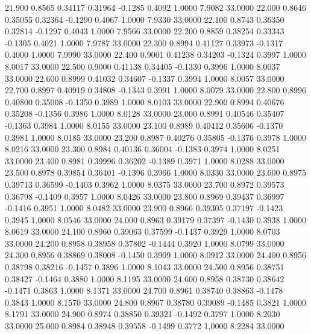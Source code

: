   21.900   0.8565   0.34117   0.31964  -0.1285   0.4092   1.0000   7.9082  33.0000
  22.000   0.8646   0.35055   0.32364  -0.1290   0.4067   1.0000   7.9330  33.0000
  22.100   0.8743   0.36350   0.32814  -0.1297   0.4043   1.0000   7.9566  33.0000
  22.200   0.8859   0.38254   0.33343  -0.1305   0.4021   1.0000   7.9787  33.0000
  22.300   0.8994   0.41127   0.33973  -0.1317   0.4000   1.0000   7.9990  33.0000
  22.400   0.9001   0.41238   0.34203  -0.1324   0.3997   1.0000   8.0017  33.0000
  22.500   0.9000   0.41138   0.34405  -0.1330   0.3996   1.0000   8.0037  33.0000
  22.600   0.8999   0.41032   0.34607  -0.1337   0.3994   1.0000   8.0057  33.0000
  22.700   0.8997   0.40919   0.34808  -0.1343   0.3991   1.0000   8.0079  33.0000
  22.800   0.8996   0.40800   0.35008  -0.1350   0.3989   1.0000   8.0103  33.0000
  22.900   0.8994   0.40676   0.35208  -0.1356   0.3986   1.0000   8.0128  33.0000
  23.000   0.8991   0.40546   0.35407  -0.1363   0.3984   1.0000   8.0155  33.0000
  23.100   0.8989   0.40412   0.35606  -0.1370   0.3981   1.0000   8.0185  33.0000
  23.200   0.8987   0.40276   0.35805  -0.1376   0.3978   1.0000   8.0216  33.0000
  23.300   0.8984   0.40136   0.36004  -0.1383   0.3974   1.0000   8.0251  33.0000
  23.400   0.8981   0.39996   0.36202  -0.1389   0.3971   1.0000   8.0288  33.0000
  23.500   0.8978   0.39854   0.36401  -0.1396   0.3966   1.0000   8.0330  33.0000
  23.600   0.8975   0.39713   0.36599  -0.1403   0.3962   1.0000   8.0375  33.0000
  23.700   0.8972   0.39573   0.36798  -0.1409   0.3957   1.0000   8.0426  33.0000
  23.800   0.8969   0.39437   0.36997  -0.1416   0.3951   1.0000   8.0482  33.0000
  23.900   0.8966   0.39305   0.37197  -0.1423   0.3945   1.0000   8.0546  33.0000
  24.000   0.8963   0.39179   0.37397  -0.1430   0.3938   1.0000   8.0619  33.0000
  24.100   0.8960   0.39063   0.37599  -0.1437   0.3929   1.0000   8.0703  33.0000
  24.200   0.8958   0.38958   0.37802  -0.1444   0.3920   1.0000   8.0799  33.0000
  24.300   0.8956   0.38869   0.38008  -0.1450   0.3909   1.0000   8.0912  33.0000
  24.400   0.8956   0.38798   0.38216  -0.1457   0.3896   1.0000   8.1043  33.0000
  24.500   0.8956   0.38751   0.38427  -0.1464   0.3880   1.0000   8.1195  33.0000
  24.600   0.8958   0.38730   0.38642  -0.1471   0.3863   1.0000   8.1371  33.0000
  24.700   0.8961   0.38740   0.38863  -0.1478   0.3843   1.0000   8.1570  33.0000
  24.800   0.8967   0.38780   0.39089  -0.1485   0.3821   1.0000   8.1791  33.0000
  24.900   0.8974   0.38850   0.39321  -0.1492   0.3797   1.0000   8.2030  33.0000
  25.000   0.8984   0.38948   0.39558  -0.1499   0.3772   1.0000   8.2284  33.0000
